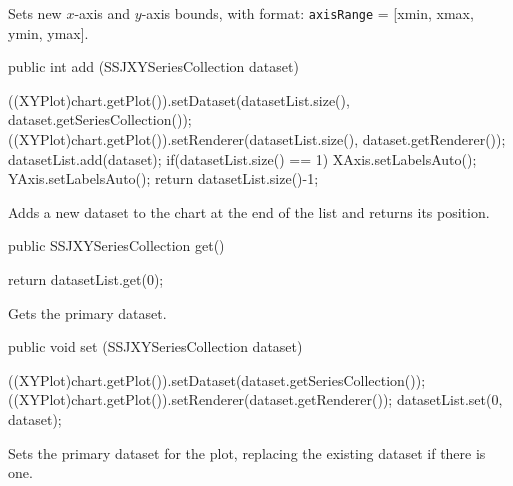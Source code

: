 \begin{tabb}
   Sets new $x$-axis and $y$-axis bounds, with format: \texttt{axisRange} = [xmin, xmax, ymin, ymax].
\end{tabb}
\begin{htmlonly}
\end{htmlonly}
\begin{code}

   public int add (SSJXYSeriesCollection dataset) \begin{hide} {
      ((XYPlot)chart.getPlot()).setDataset(datasetList.size(),
                  dataset.getSeriesCollection());
      ((XYPlot)chart.getPlot()).setRenderer(datasetList.size(),
                  dataset.getRenderer());
      datasetList.add(dataset);
      if(datasetList.size() == 1) {
         XAxis.setLabelsAuto();
         YAxis.setLabelsAuto();
      }
      return datasetList.size()-1;
   }\end{hide}
\end{code}
\begin{tabb}
   Adds a new dataset to the chart at the end of the list and returns its position.
\end{tabb}
\begin{htmlonly}
\end{htmlonly}
\begin{code}

   public SSJXYSeriesCollection get() \begin{hide} {
      return datasetList.get(0);
   }\end{hide}
\end{code}
\begin{tabb}
   Gets the primary dataset.
\end{tabb}
\begin{htmlonly}
\end{htmlonly}
\begin{code}

   public void set (SSJXYSeriesCollection dataset) \begin{hide} {
      ((XYPlot)chart.getPlot()).setDataset(dataset.getSeriesCollection());
      ((XYPlot)chart.getPlot()).setRenderer(dataset.getRenderer());
      datasetList.set(0, dataset);
   }\end{hide}
\end{code}
\begin{tabb}
    Sets the primary dataset for the plot, replacing the existing dataset if there is one.
\end{tabb}
